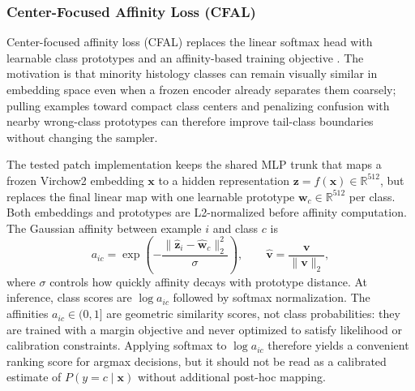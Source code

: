 \documentclass[11pt]{article}
\begin{document}
\subsubsection{Center-Focused Affinity Loss (CFAL)}
Center-focused affinity loss (CFAL) replaces the linear softmax head with learnable class prototypes and an affinity-based training objective \citep{mahbub2024centerFocused}. The motivation is that minority histology classes can remain visually similar in embedding space even when a frozen encoder already separates them coarsely; pulling examples toward compact class centers and penalizing confusion with nearby wrong-class prototypes can therefore improve tail-class boundaries without changing the sampler.

The tested patch implementation keeps the shared MLP trunk that maps a frozen Virchow2 embedding $\mathbf{x}$ to a hidden representation $\mathbf{z}=f(\mathbf{x})\in\mathbb{R}^{512}$, but replaces the final linear map with one learnable prototype $\mathbf{w}_c\in\mathbb{R}^{512}$ per class. Both embeddings and prototypes are L2-normalized before affinity computation. The Gaussian affinity between example $i$ and class $c$ is
\begin{equation}
  a_{ic}=\exp\!\left(-\frac{\|\hat{\mathbf{z}}_i-\hat{\mathbf{w}}_c\|_2^2}{\sigma}\right),
  \qquad
  \hat{\mathbf{v}}=\frac{\mathbf{v}}{\|\mathbf{v}\|_2},
  \label{eq:cfal-affinity}
\end{equation}
\noindent where $\sigma$ controls how quickly affinity decays with prototype distance. At inference, class scores are $\log a_{ic}$ followed by softmax normalization. The affinities $a_{ic}\in(0,1]$ are geometric similarity scores, not class probabilities: they are trained with a margin objective and never optimized to satisfy likelihood or calibration constraints. Applying softmax to $\log a_{ic}$ therefore yields a convenient ranking score for argmax decisions, but it should not be read as a calibrated estimate of $P(y=c\mid \mathbf{x})$ without additional post-hoc mapping.
\end{document}
